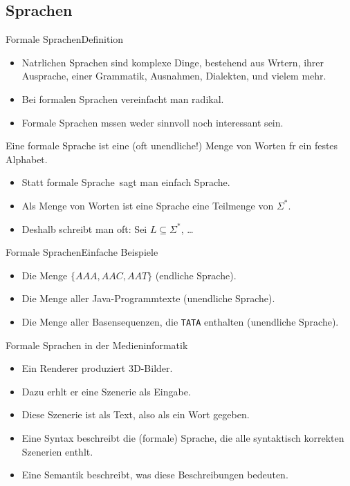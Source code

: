 \subsection{Sprachen}

\begin{frame}{Formale Sprachen}{Definition}
  \begin{itemize}
  \item Natrlichen Sprachen sind komplexe Dinge, bestehend aus
    Wrtern, ihrer Ausprache, einer Grammatik, Ausnahmen, Dialekten,
    und vielem mehr.
  \item Bei \alert{formalen Sprachen} vereinfacht man radikal.
  \item Formale Sprachen mssen weder sinnvoll noch interessant sein.      
  \end{itemize}

  \begin{definition}
    Eine \alert{formale Sprache} ist eine (oft unendliche!) Menge von
    Worten fr ein festes Alphabet.
  \end{definition}

  \begin{itemize}
  \item Statt \frqq formale Sprache\flqq\ sagt man einfach \frqq Sprache\flqq.
  \item Als Menge von Worten ist eine Sprache eine Teilmenge von
    $\Sigma^*$.
  \item 
    Deshalb schreibt man oft: \frqq Sei $L \subseteq \Sigma^*$,
    \dots\flqq
  \end{itemize}
\end{frame}

\begin{frame}{Formale Sprachen}{Einfache Beispiele}
  \begin{examples}
    \begin{itemize}
    \item Die Menge $\{AAA, AAC, AAT\}$ (endliche Sprache).
    \item Die Menge aller Java-Programmtexte (unendliche Sprache).
    \item Die Menge aller Basensequenzen, die \texttt{TATA} enthalten
      (unendliche Sprache).
    \end{itemize}
  \end{examples} 
\end{frame}

\begin{frame}{Formale Sprachen in der Medieninformatik}
  \begin{itemize}
  \item Ein Renderer produziert 3D-Bilder.
  \item Dazu erhlt er eine \alert{Szenerie} als Eingabe.
  \item Diese Szenerie ist als \alert{Text}, also als ein \alert{Wort} gegeben.
  \item Eine \alert{Syntax} beschreibt die (formale) Sprache, die alle
    \alert{syntaktisch korrekten Szenerien}  enthlt.
  \item Eine \alert{Semantik} beschreibt, was diese Beschreibungen bedeuten.
  \end{itemize}
\end{frame}

